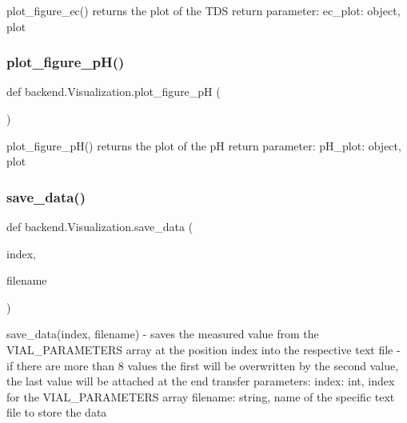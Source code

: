 \begin{DoxyVerb}plot_figure_ec() returns the plot of the TDS
return parameter:
    ec_plot: object, plot
\end{DoxyVerb}
 \mbox{\label{classbackend_1_1Visualization_a8e602dcd5cf032f607293402f7307f58_a8e602dcd5cf032f607293402f7307f58}} 
\subsubsection{\texorpdfstring{plot\+\_\+figure\+\_\+p\+H()}{plot\_figure\_pH()}}
{\footnotesize\ttfamily def backend.\+Visualization.\+plot\+\_\+figure\+\_\+pH (\begin{DoxyParamCaption}{ }\end{DoxyParamCaption})}

\begin{DoxyVerb}plot_figure_pH() returns the plot of the pH
return parameter:
    pH_plot: object, plot
\end{DoxyVerb}
 \mbox{\label{classbackend_1_1Visualization_a574922c835063b7f555fc2c57e231dcb_a574922c835063b7f555fc2c57e231dcb}} 
\subsubsection{\texorpdfstring{save\+\_\+data()}{save\_data()}}
{\footnotesize\ttfamily def backend.\+Visualization.\+save\+\_\+data (\begin{DoxyParamCaption}\item[{}]{index,  }\item[{}]{filename }\end{DoxyParamCaption})}

\begin{DoxyVerb}save_data(index, filename)
    - saves the measured value from the VIAL_PARAMETERS array at the position index into the respective text file
    - if there are more than 8 values the first will be overwritten by the second value, the last
      value will be attached at the end
transfer parameters:
    index:    int, index for the VIAL_PARAMETERS array
    filename: string, name of the specific text file to store the data
\end{DoxyVerb}
 \mbox{\label{classbackend_1_1Visualization_a19943c0c133c66353ecb0129ee490aeb_a19943c0c133c66353ecb0129ee490aeb}} 
